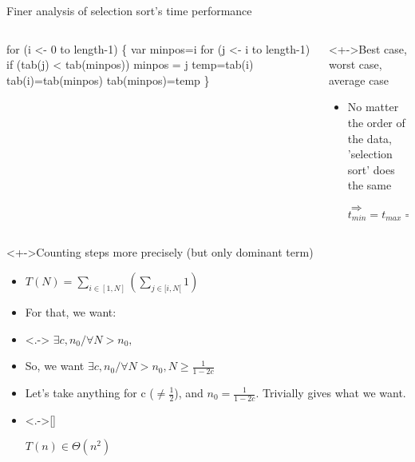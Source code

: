 \begin{frame}[fragile]{Finer analysis of selection sort's time performance}
  \begin{columns}
    \begin{column}{.37\linewidth}
        \begin{boitecode}{}
for (i <- 0 to length-1) \{
  var minpos=i
  for (j <- i to length-1)
    if (tab(j) < tab(minpos))
      minpos = j
  temp=tab(i)
  tab(i)=tab(minpos)
  tab(minpos)=temp
\}
        \end{boitecode}
    \end{column}

    \begin{column}{.6\linewidth} 
      \begin{block}<+->{Best case, worst case, average case}
        \begin{itemize}
        \item No matter the order of the data,\\
          'selection sort' does the same
        \item[$\Rightarrow$] $t_{min}=t_{max}=t_{avg}$
        \end{itemize}
      \end{block}     
    \end{column}
  \end{columns}\vspace{-\baselineskip}

  \begin{block}<+->{Counting steps more precisely (but only dominant term)}
    \begin{itemize}\vspace{-.2\baselineskip}
    \item $\displaystyle T(N)=\sum_{i\in[1,N]}\left(\sum_{j\in{[i,N[}}1\right)$

    \item<+-> 
      For that, we want:
    \item<.-> $\exists c, n_0 / \forall N>n_0,$ 
    \item<+-> So, we want $\exists c, n_0 / \forall N>n_0, N\ge \frac{1}{1-2c}$
    \item<+-> Let's take anything for c ($\neq\frac{1}{2}$), and
      $n_0=\frac{1}{1-2c}$. Trivially gives what we want.
      
    \item<.->[] \centerline{\alert{$T(n)\in\Theta(n^2)$}}

    \end{itemize}
  \end{block}
\end{frame}
